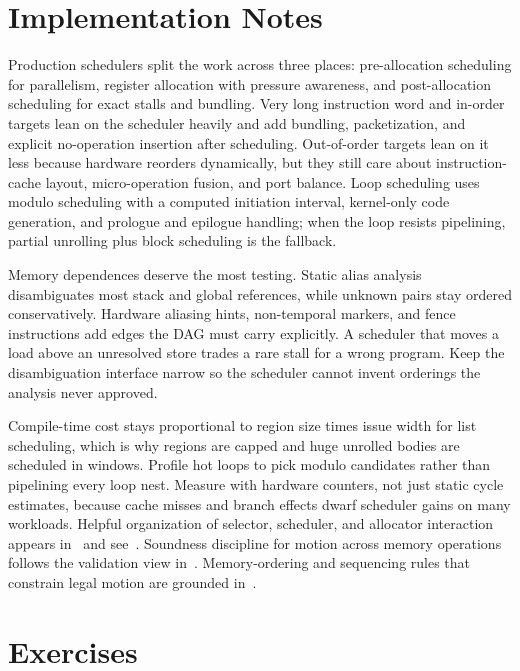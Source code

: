 \section{Implementation Notes}\label{sec:ch26-implementation}

Production schedulers split the work across three places: pre-allocation scheduling for parallelism, register allocation with pressure awareness, and post-allocation scheduling for exact stalls and bundling.
Very long instruction word and in-order targets lean on the scheduler heavily and add bundling, packetization, and explicit no-operation insertion after scheduling.
Out-of-order targets lean on it less because hardware reorders dynamically, but they still care about instruction-cache layout, micro-operation fusion, and port balance.
Loop scheduling uses modulo scheduling with a computed initiation interval, kernel-only code generation, and prologue and epilogue handling; when the loop resists pipelining, partial unrolling plus block scheduling is the fallback.

Memory dependences deserve the most testing.
Static alias analysis disambiguates most stack and global references, while unknown pairs stay ordered conservatively.
Hardware aliasing hints, non-temporal markers, and fence instructions add edges the DAG must carry explicitly.
A scheduler that moves a load above an unresolved store trades a rare stall for a wrong program.
Keep the disambiguation interface narrow so the scheduler cannot invent orderings the analysis never approved.

Compile-time cost stays proportional to region size times issue width for list scheduling, which is why regions are capped and huge unrolled bodies are scheduled in windows.
Profile hot loops to pick modulo candidates rather than pipelining every loop nest.
Measure with hardware counters, not just static cycle estimates, because cache misses and branch effects dwarf scheduler gains on many workloads.
Helpful organization of selector, scheduler, and allocator interaction appears in~\cite{morgan-1998-optimizing} and see~\cite{appel-1998-modern}.
Soundness discipline for motion across memory operations follows the validation view in~\cite{safonov-2010-trustworthy}.
Memory-ordering and sequencing rules that constrain legal motion are grounded in~\cite{wg14-2011-c11}.

\section{Exercises}\label{sec:ch26-exercises}

